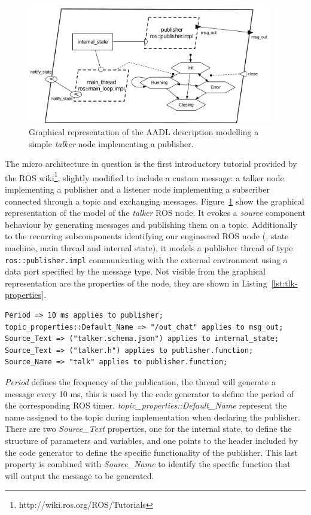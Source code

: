\begin{figure}[t]
\centering
\includegraphics[width=0.95\textwidth]{gfx/usecase-publisher}
\caption{Graphical representation of the AADL description modelling a simple \textit{talker} node implementing a publisher.}\label{fig:usecase-publisher}
\end{figure}

The micro architecture in question is the first introductory tutorial provided by the ROS wiki\footnote{http://wiki.ros.org/ROS/Tutorials}, slightly modified to include a custom message: a talker node implementing a publisher and a listener node implementing a subscriber connected through a topic and exchanging messages. Figure~\ref{fig:usecase-publisher} show the graphical representation of the model of the \textit{talker} ROS node. It evokes a \textit{source} component behaviour by generating messages and publishing them on a topic. Additionally to the recurring subcomponents identifying our engineered ROS node (\ie, state machine, main thread and internal state), it models a publisher thread of type \texttt{ros::publisher.impl} communicating with the external environment using a data port specified by the message type. Not visible from the graphical representation are the properties of the node, they are shown in Listing~\ref{lst:tlk-properties}.

\begin{lstlisting}[language=AADL,caption={Properties of the talker node.},label=lst:tlk-properties]
Period => 10 ms applies to publisher;
topic_properties::Default_Name => "/out_chat" applies to msg_out;
Source_Text => ("talker.schema.json") applies to internal_state;
Source_Text => ("talker.h") applies to publisher.function;
Source_Name => "talk" applies to publisher.function;
\end{lstlisting}

\textit{Period} defines the frequency of the publication, the thread will generate a message every 10 ms, this is used by the code generator to define the period of the corresponding ROS timer. \textit{topic\_properties::Default\_Name} represent the name assigned to the topic during implementation when declaring the publisher. There are two \textit{Source\_Text} properties, one for the internal state, to define the structure of parameters and variables, and one points to the header included by the code generator to define the specific functionality of the publisher. This last property is combined with \textit{Source\_Name} to identify the specific function that will output the message to be generated.

